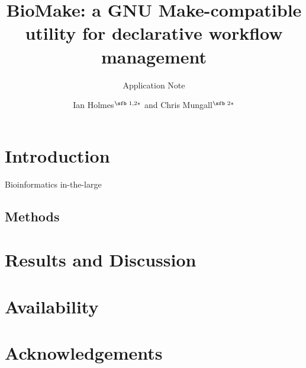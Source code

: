 \documentclass{bioinfo}
\begin{document}

\subtitle{Application Note}

\title[BioMake: declarative workflow management]{BioMake: a GNU Make-compatible utility for declarative workflow management}
\author[Ian Holmes and Chris Mungall]{Ian Holmes$^{\text{\sfb 1,2}*}$ and Chris Mungall$^{\text{\sfb 2}*}$}
\address{$^{\text{\sf 1}}$Department of Bioengineering, University of California, Berkeley, CA 94720, USA and \\
$^{\text{\sf 2}}$Lawrence Berkeley National Laboratory, 1 Cyclotron Rd, Berkeley, CA 94720, USA.}


\history{}

\editor{}


\maketitle

\section{Introduction}

Bioinformatics in-the-large \citep{ParkerGorlickLee2003}

\begin{methods}
\section{Methods}

\end{methods}

\section{Results and Discussion}

\section{Availability}

\section*{Acknowledgements}
\end{document}
